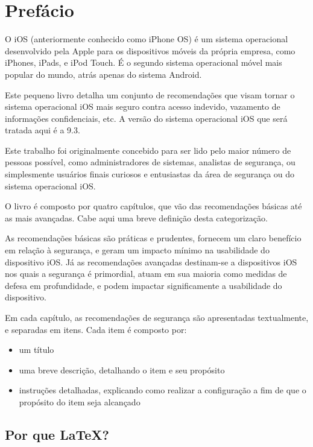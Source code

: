 \chapter*{Pref\'acio}

O iOS (anteriormente conhecido como iPhone OS) \'e um sistema operacional desenvolvido pela Apple para os dispositivos m\'oveis da pr\'opria empresa, como iPhones, iPads, e iPod Touch. \'E o segundo sistema operacional m\'ovel mais popular do mundo, atr\'as apenas do sistema Android. 

Este pequeno livro detalha um conjunto de recomenda\c c\~oes que visam tornar o sistema operacional iOS mais seguro contra acesso indevido, vazamento de informa\c c\~oes confidenciais, etc. A vers\~ao do sistema operacional iOS que ser\'a tratada aqui \'e a 9.3.

Este trabalho foi originalmente concebido para ser lido pelo maior n\'umero de pessoas poss\'ivel, como administradores de sistemas, analistas de seguran\c ca, ou simplesmente usu\'arios finais curiosos e entusiastas da \'area de seguran\c ca ou do sistema operacional iOS.

O livro \'e composto por quatro cap\'itulos, que v\~ao das recomenda\c c\~oes b\'asicas at\'e as mais avan\c cadas. Cabe aqui uma breve defini\c c\~ao desta categoriza\c c\~ao. 

As recomenda\c c\~oes b\'asicas s\~ao pr\'aticas e prudentes, fornecem um claro benef\'icio em rela\c c\~ao \`a seguran\c ca, e geram um impacto m\'inimo na usabilidade do dispositivo iOS. J\'a as recomenda\c c\~oes avan\c cadas destinam-se a dispositivos iOS nos quais a seguran\c ca \'e primordial, atuam em sua maioria como medidas de defesa em profundidade, e podem impactar significamente a usabilidade do dispositivo.

Em cada cap\'itulo, as recomenda\c c\~oes de seguran\c ca s\~ao apresentadas textualmente, e separadas em itens. Cada item \'e composto por:

\begin{itemize}
\item um t\'itulo
\item uma breve descri\c c\~ao, detalhando o item e seu prop\'osito
\item instru\c c\~oes detalhadas, explicando como realizar a configura\c c\~ao a fim de que o prop\'osito do item seja alcan\c cado
\end{itemize}

\section*{Por que \LaTeX?}


